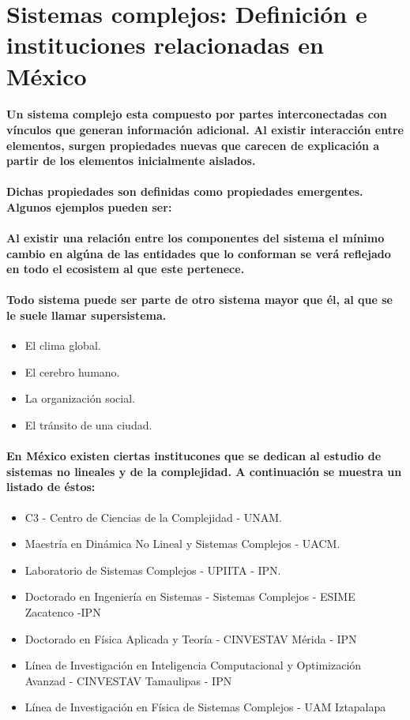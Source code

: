 \section{Sistemas complejos:  Definición e instituciones relacionadas en México}
  \paragraph{
  Un sistema complejo esta compuesto por partes interconectadas con vínculos que generan información adicional. Al existir interacción entre elementos, surgen propiedades nuevas que carecen de explicación a partir de los elementos inicialmente aislados.
  }
  \paragraph{
  Dichas propiedades son definidas como propiedades emergentes. Algunos ejemplos pueden ser:
  }
  \paragraph{
  Al existir una relación entre los componentes del sistema el mínimo cambio en algúna de las entidades que lo conforman se verá reflejado en todo el ecosistem al que este pertenece.
  }
  \paragraph{
  Todo sistema puede ser parte de otro sistema mayor que él, al que se le suele llamar supersistema.
  }
  \begin{itemize}
    \item El clima global.
    \item El cerebro humano.
    \item La organización social.
    \item El tránsito de una ciudad.
  \end{itemize}
  \paragraph{En México existen ciertas institucones que se dedican al estudio de sistemas no lineales y de la complejidad. A continuación se muestra un listado de éstos:}
  \begin{itemize}
    \item C3 - Centro de Ciencias de la Complejidad - UNAM.
    \item Maestría en Dinámica No Lineal y Sistemas Complejos - UACM.
    \item Laboratorio de Sistemas Complejos - UPIITA - IPN.
    \item Doctorado en Ingeniería en Sistemas - Sistemas Complejos - ESIME Zacatenco -IPN
    \item Doctorado en Física Aplicada y Teoría - CINVESTAV Mérida - IPN
    \item Línea de Investigación en Inteligencia Computacional y Optimización Avanzad - CINVESTAV Tamaulipas - IPN
    \item Línea de Investigación en Física de Sistemas Complejos - UAM Iztapalapa
  \end{itemize}
  \clearpage
